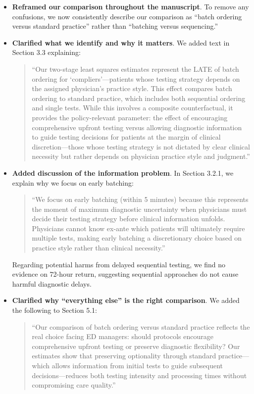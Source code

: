\documentclass[11pt]{article}
\newcommand{\1}{\hbox{\rm 1\kern-.35em 1}}
\begin{document}
\begin{itemize}
    \item \textbf{Reframed our comparison throughout the manuscript}. To remove any confusions, we now consistently describe our comparison as ``batch ordering versus standard practice'' rather than ``batching versus sequencing.''
    
    \item \textbf{Clarified what we identify and why it matters}. We added text in Section 3.3 explaining:
    \begin{quote}
    ``Our two-stage least squares estimates represent the LATE of batch ordering for `compliers'---patients whose testing strategy depends on the assigned physician's practice style. This effect compares batch ordering to standard practice, which includes both sequential ordering and single tests. While this involves a composite counterfactual, it provides the policy-relevant parameter: the effect of encouraging comprehensive upfront testing versus allowing diagnostic information to guide testing decisions for patients at the margin of clinical discretion—those whose testing strategy is not dictated by clear clinical necessity but rather depends on physician practice style and judgment.''
    \end{quote}
    
    \item \textbf{Added discussion of the information problem}. In Section 3.2.1, we explain why we focus on early batching:
    \begin{quote}
    ``We focus on early batching (within 5 minutes) because this represents the moment of maximum diagnostic uncertainty when physicians must decide their testing strategy before clinical information unfolds. Physicians cannot know ex-ante which patients will ultimately require multiple tests, making early batching a discretionary choice based on practice style rather than clinical necessity.''
    \end{quote}

Regarding potential harms from delayed sequential testing, we find no evidence on 72-hour return, suggesting sequential approaches do not cause harmful diagnostic delays.

\item \textbf{Clarified why ``everything else'' is the right comparison}. We added the following to Section 5.1:
\begin{quote}
    ``Our comparison of batch ordering versus standard practice reflects the real choice facing ED managers: should protocols encourage comprehensive upfront testing or preserve diagnostic flexibility? Our estimates show that preserving optionality through standard practice—which allows information from initial tests to guide subsequent decisions—reduces both testing intensity and processing times without compromising care quality.''
\end{quote}
\end{itemize}
\end{document}
